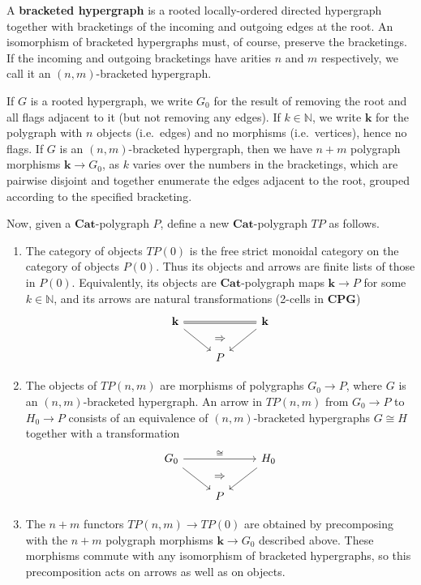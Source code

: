 \documentclass{article}
\theoremstyle{definition}
\theoremstyle{remark}
\def\Cat{\ensuremath{\mathbf{Cat}}}
\def\cpg{\ensuremath{\mathbf{CPG}}\xspace}
\def\N{\mathbb{N}}
\begin{document}
A \textbf{bracketed hypergraph} is a rooted locally-ordered directed hypergraph together with bracketings of the incoming and outgoing edges at the root.
An isomorphism of bracketed hypergraphs must, of course, preserve the bracketings.
If the incoming and outgoing bracketings have arities $n$ and $m$ respectively, we call it an $(n,m)$-bracketed hypergraph.

If $G$ is a rooted hypergraph, we write $G_0$ for the result of removing the root and all flags adjacent to it (but not removing any edges).
If $k\in\N$, we write $\mathbf{k}$ for the polygraph with $n$ objects (i.e.\ edges) and no morphisms (i.e.\ vertices), hence no flags.
If $G$ is an $(n,m)$-bracketed hypergraph, then we have $n+m$ polygraph morphisms $\mathbf{k}\to G_0$, as $k$ varies over the numbers in the bracketings, which are pairwise disjoint and together enumerate the edges adjacent to the root, grouped according to the specified bracketing.

Now, given a \Cat-polygraph $P$, define a new \Cat-polygraph $T P$ as follows.
\begin{enumerate}
\item The category of objects $T P(0)$ is the free strict monoidal category on the category of objects $P(0)$.
  Thus its objects and arrows are finite lists of those in $P(0)$.
  Equivalently, its objects are \Cat-polygraph maps $\mathbf{k}\to P$ for some $k\in\N$, and its arrows are natural transformations (2-cells in \cpg)
  \[
  \begin{tikzcd}
    \mathbf{k} \ar[rr,equals] \ar[dr] & ~ \ar[d,phantom,"\Rightarrow"] & \mathbf{k} \ar[dl] \\ & P
  \end{tikzcd}
  \]
\item The objects of $TP(n,m)$ are morphisms of polygraphs $G_0\to P$, where $G$ is an $(n,m)$-bracketed hypergraph.
  An arrow in $TP(n,m)$ from $G_0\to P$ to $H_0\to P$ consists of an equivalence of $(n,m)$-bracketed hypergraphs $G\cong H$ together with a transformation
  \[
  \begin{tikzcd}
    G_0 \ar[rr,"\cong"] \ar[dr] & ~ \ar[d,phantom,"\Rightarrow"] & H_0 \ar[dl] \\ & P
  \end{tikzcd}
  \]
\item The $n+m$ functors $TP(n,m) \to TP(0)$ are obtained by precomposing with the $n+m$ polygraph morphisms $\mathbf{k}\to G_0$ described above.
  These morphisms commute with any isomorphism of bracketed hypergraphs, so this precomposition acts on arrows as well as on objects.
\end{enumerate}
\end{document}
